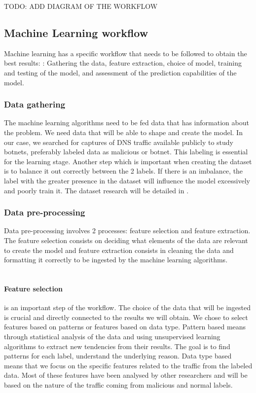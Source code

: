TODO: ADD DIAGRAM OF THE WORKFLOW

\subsection{Machine Learning workflow}
Machine learning has a specific workflow that needs to be followed to obtain the best results: \cite{ml-workflow}: Gathering the data, feature extraction, choice of model, training and testing of the model, and assessment of the prediction capabilities of the model.

\subsubsection{Data gathering} The machine learning algorithms need to be fed data that has information about the problem. We need data that will be able to shape and create the model. In our case, we searched for captures of DNS traffic available publicly to study botnets, preferably labeled data as malicious or botnet. This labeling is essential for the learning stage. Another step which is important when creating the dataset is to balance it out correctly between the 2 labels. If there is an imbalance, the label with the greater presence in the dataset will influence the model excessively and poorly train it. The dataset research will be detailed in \label{datasetchapter}.

\subsubsection{Data pre-processing} 
Data pre-processing involves 2 processes: feature selection and feature extraction. The feature selection consists on deciding what elements of the data are relevant to create the model and feature extraction consists in cleaning the data and formatting it correctly to be ingested by the machine learning algorithms.\\\\

\paragraph{Feature selection} is an important step of the workflow. The choice of the data that will be ingested is crucial and directly connected to the results we will obtain. We chose to select features based on patterns or features based on data type. Pattern based means through statistical analysis of the data and using unsupervised learning algorithms to extract new tendencies from their results. The goal is to find patterns for each label, understand the underlying reason. Data type based means that we focus on the  specific features related to the traffic from the labeled data. Most of these features have been analysed by other researchers and will be based on the nature of the traffic coming from malicious and normal labels.\label{featureselectionlabel}

